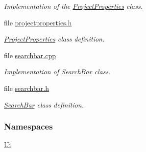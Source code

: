 \begin{DoxyCompactItemize}
\begin{DoxyCompactList}\small\item\em Implementation of the \hyperlink{class_project_properties}{Project\+Properties} class. \end{DoxyCompactList}\item 
file \hyperlink{projectproperties_8h}{projectproperties.\+h}
\begin{DoxyCompactList}\small\item\em \hyperlink{class_project_properties}{Project\+Properties} class definition. \end{DoxyCompactList}\item 
file \hyperlink{searchbar_8cpp}{searchbar.\+cpp}
\begin{DoxyCompactList}\small\item\em Implementation of \hyperlink{class_search_bar}{Search\+Bar} class. \end{DoxyCompactList}\item 
file \hyperlink{searchbar_8h}{searchbar.\+h}
\begin{DoxyCompactList}\small\item\em \hyperlink{class_search_bar}{Search\+Bar} class definition. \end{DoxyCompactList}\end{DoxyCompactItemize}
\subsubsection*{Namespaces}
\begin{DoxyCompactItemize}
\item 
 \hyperlink{namespace_ui}{Ui}
\end{DoxyCompactItemize}
